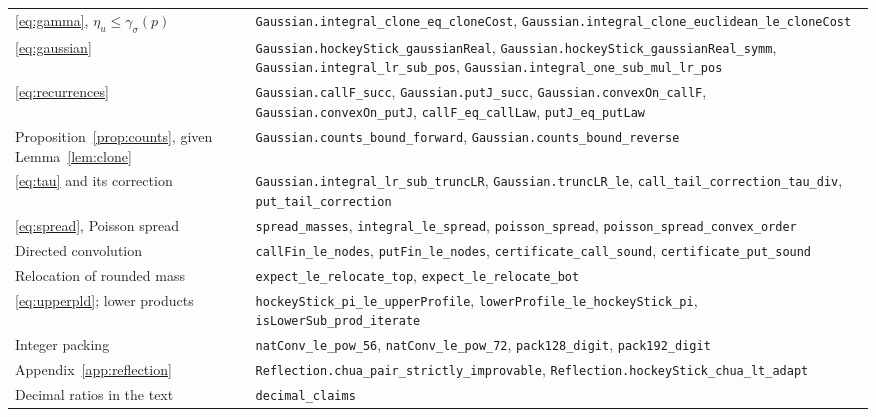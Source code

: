 \documentclass[conference]{IEEEtran}
\begin{document}
\begin{table}[t]
\begin{tabular}{@{}>{\raggedright\arraybackslash}p{}>{\raggedright\arraybackslash}p{}@{}}
\eqref{eq:gamma}, $\eta_u\le\gamma_\sigma(p)$ & \texttt{Gaussian.integral\_clone\_eq\_cloneCost}, \texttt{Gaussian.integral\_clone\_euclidean\_le\_cloneCost}\\
\eqref{eq:gaussian} & \texttt{Gaussian.hockeyStick\_gaussianReal}, \texttt{Gaussian.hockeyStick\_gaussianReal\_symm}, \texttt{Gaussian.integral\_lr\_sub\_pos}, \texttt{Gaussian.integral\_one\_sub\_mul\_lr\_pos}\\
\eqref{eq:recurrences} & \texttt{Gaussian.callF\_succ}, \texttt{Gaussian.putJ\_succ}, \texttt{Gaussian.convexOn\_callF}, \texttt{Gaussian.convexOn\_putJ}, \texttt{callF\_eq\_callLaw}, \texttt{putJ\_eq\_putLaw}\\
Proposition~\ref{prop:counts}, given Lemma~\ref{lem:clone} & \texttt{Gaussian.counts\_bound\_forward}, \texttt{Gaussian.counts\_bound\_reverse}\\
\eqref{eq:tau} and its correction & \texttt{Gaussian.integral\_lr\_sub\_truncLR}, \texttt{Gaussian.truncLR\_le}, \texttt{call\_tail\_correction\_tau\_div}, \texttt{put\_tail\_correction}\\
\eqref{eq:spread}, Poisson spread & \texttt{spread\_masses}, \texttt{integral\_le\_spread}, \texttt{poisson\_spread}, \texttt{poisson\_spread\_convex\_order}\\
Directed convolution & \texttt{callFin\_le\_nodes}, \texttt{putFin\_le\_nodes}, \texttt{certificate\_call\_sound}, \texttt{certificate\_put\_sound}\\
Relocation of rounded mass & \texttt{expect\_le\_relocate\_top}, \texttt{expect\_le\_relocate\_bot}\\
\eqref{eq:upperpld}; lower products & \texttt{hockeyStick\_pi\_le\_upperProfile}, \texttt{lowerProfile\_le\_hockeyStick\_pi}, \texttt{isLowerSub\_prod\_iterate}\\
Integer packing & \texttt{natConv\_le\_pow\_56}, \texttt{natConv\_le\_pow\_72}, \texttt{pack128\_digit}, \texttt{pack192\_digit}\\
Appendix~\ref{app:reflection} & \texttt{Reflection.chua\_pair\_strictly\_improvable}, \texttt{Reflection.hockeyStick\_chua\_lt\_adapt}\\
Decimal ratios in the text & \texttt{decimal\_claims}\\
\bottomrule
\end{tabular}
\end{table}
\end{document}
